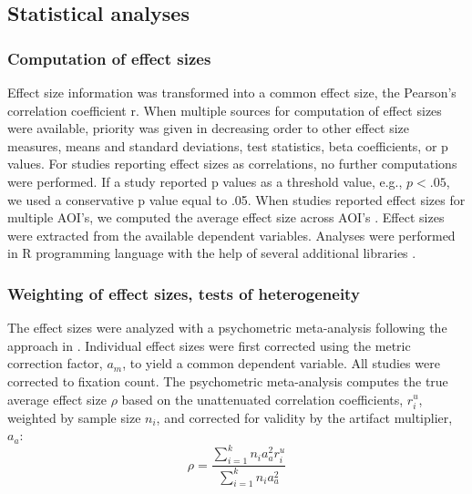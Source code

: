 \subsection{Statistical analyses}
\subsubsection{Computation of effect sizes}

Effect size information was transformed into a common effect size, the Pearson’s correlation coefficient r. When multiple sources for computation of effect sizes were available, priority was given in decreasing order to other effect size measures, means and standard deviations, test statistics, beta coefficients, or p values. For studies reporting effect sizes as correlations, no further computations were performed. If a study reported p values as a threshold value, e.g., $p < .05$, we used a conservative p value equal to .05. When studies reported effect sizes for multiple AOI's, we computed the average effect size across AOI's \citep[for a similar approach, see][]{chita2016attention}. Effect sizes were extracted from the available dependent variables. Analyses were performed in R programming language with the help of several additional libraries \citep{R2020,datatable,tidyverse,metafor,irr,lme4,lmerTest,xtable,extrafont}.  %


\subsubsection{Weighting of effect sizes, tests of heterogeneity}

The effect sizes were analyzed with a psychometric meta-analysis following the approach in \cite{hunter2004a}. Individual effect sizes were first corrected using the metric correction factor, $a_m$, to yield a common dependent variable. All studies were corrected to fixation count. The psychometric meta-analysis computes the true average effect size $\rho$ based on the unattenuated correlation coefficients, $r_i^u$, weighted by sample size $n_i$, and corrected for validity by the artifact multiplier, $a_a$: 
%
\begin{equation}
\label{eq:psychometric_rho}
\rho = \frac{\sum_{i=1}^k n_i a_a^2 r_i^u}{\sum_{i=1}^k n_i a_a^2}
\end{equation}


